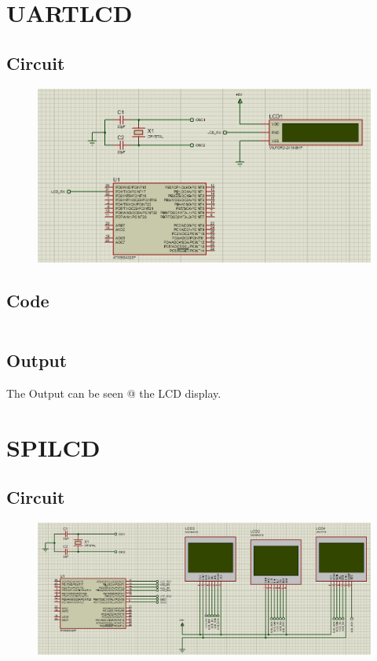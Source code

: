 \documentclass[oneside]{book}
\begin{document}
\section{UARTLCD}
\subsection{Circuit}
\begin{figure}[H]
    \centering
    \includegraphics[height=0.2\textheight]{UARTLCD.png}
\end{figure}
\subsection{Code}
\inputminted[bgcolor=black]{c}{../programFiles/UARTLCD.c}

\subsection{Output}
\quad The Output can be seen @ the LCD display.

\section{SPILCD}
\subsection{Circuit}
\begin{figure}[H]
    \centering
    \includegraphics[height=0.2\textheight]{SPILCD.png}
\end{figure}
\end{document}
